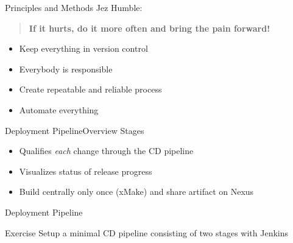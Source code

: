 \begin{frame}{Principles and Methods}
Jez Humble:
\begin{quote}
\textbf{If it hurts, do it more often and bring the pain forward!}
\end{quote}
\vfill
  \begin{itemize}
    \item Keep everything in version control
    \item Everybody is responsible
    \item Create repeatable and reliable process
    \item Automate everything
  \end{itemize}
\end{frame}

\begin{frame}{Deployment Pipeline}{Overview Stages}
  \centerline{
  }

  \begin{itemize}
    \item Qualifies \emph{each} change through the CD pipeline
    \item Visualizes status of release progress
    \item Build centrally only once (xMake) and share artifact on Nexus
  \end{itemize}
\end{frame}

\begin{frame}{Deployment Pipeline}
  \begin{center}
  \end{center}
\end{frame}

\begin{frame}{Exercise}
Setup a minimal CD pipeline consisting of two stages with Jenkins
\begin{center}
	\vspace{5mm}
	\vspace{3mm}

\end{center}
\end{frame}


